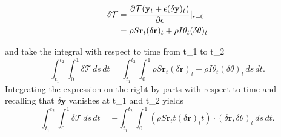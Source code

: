 \documentclass[12pt]{article}
\begin{document}
\begin{equation}
\begin{split}
 \delta\mathcal{T}& = \frac{\partial \mathcal{T}(\mathbf{y}_t + \epsilon (\delta \mathbf{y})_t )}{\partial{\epsilon}} \arrowvert_{\epsilon=0}\\
                  & = \rho S\mathbf{r}_t (\delta\mathbf{r})_t + \rho I \theta_t (\delta \theta)_t\\
\end{split}
\end{equation}

and take the integral with respect to time from t_1 to t_2
\[\int_{t_1}^{t_2} \int_{0}^{1} \delta \mathcal{T}\, ds \, dt = \int_{t_1}^{t_2} \int_{0}^{1} \rho S\mathbf{r}_t (\delta\mathbf{r})_t + \rho I \theta_t (\delta \theta)_t\, ds \, dt.
\]
Integrating the expression on the right by parts with respect to time and recalling that $\delta\mathbf{y}$ vanishes at t_1 and t_2  yields
\[\int_{t_1}^{t_2} \int_{0}^{1} \delta \mathcal{T}\, ds \, dt = -\int_{t_1}^{t_2} \int_{0}^{1} (\rho S\mathbf{r}_tt (\delta\mathbf{r})_tt)\cdot(\delta\mathbf{r},\delta\theta)_t\, ds \, dt.
\]
\end{document}
